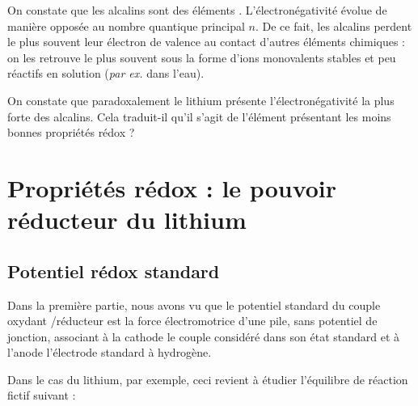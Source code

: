 On constate que les alcalins sont des éléments . L'électronégativité évolue de manière opposée au nombre quantique principal $n$. De ce fait, les alcalins perdent le plus souvent leur électron de valence au contact d'autres éléments chimiques : on les retrouve le plus souvent sous la forme d'ions monovalents stables et peu réactifs en solution (\emph{par ex.} dans l'eau).

On constate que paradoxalement le lithium présente l'électronégativité la plus forte des alcalins. Cela traduit-il qu'il s'agit de l'élément présentant les moins bonnes propriétés rédox ?






\section{Propriétés rédox : le pouvoir réducteur du lithium}

\subsection{Potentiel rédox standard}
Dans la première partie, nous avons vu que le potentiel standard du couple oxydant /réducteur  est la force électromotrice d'une pile, sans potentiel de jonction, associant à la cathode le couple considéré dans son état standard et à l'anode l'électrode standard à hydrogène. %

Dans le cas du lithium, par exemple, ceci revient à étudier l'équilibre de réaction fictif suivant : 

